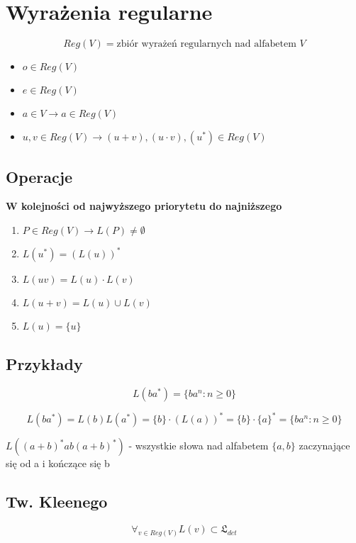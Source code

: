 \documentclass{../notatki}
\begin{document}
\section{Wyrażenia regularne}

$$
Reg(V) = \text{zbiór wyrażeń regularnych nad alfabetem } V
$$

\begin{itemize}
    \item $o \in Reg(V)$
    \item $e \in Reg(V)$
    \item $a \in V \rightarrow a \in Reg(V)$
    \item $u, v \in Reg(V) \rightarrow (u + v), (u \cdot v), (u^*) \in Reg(V)$
\end{itemize}

\subsection{Operacje}

\textbf{W kolejności od najwyższego priorytetu do najniższego}

\begin{enumerate}
    \item $P \in Reg(V) \rightarrow L(P) \ne \emptyset$
    \item $L(u^*) = (L(u))^*$
    \item $L(uv) = L(u) \cdot L(v)$
    \item $L(u + v) = L(u) \cup L(v)$
    \item $L(u) = \{u\}$
\end{enumerate}

\subsection{Przykłady}

$$
L(ba^*) = \{ba^n : n \ge 0\}
$$

$$
L(ba^*) = L(b)L(a^*) = \{b\} \cdot (L(a))^* = \{b\} \cdot \{a\}^* = \{ba^n : n \ge 0\}
$$

$L((a + b)^*ab(a + b)^*)$ - wszystkie słowa nad alfabetem $\{a, b\}$ zaczynające się od a i kończące się b

\subsection{Tw. Kleenego}

$$
\forall_{v \in Reg(V)}L(v) \subset \mathfrak{L}_{det}  
$$
\end{document}
